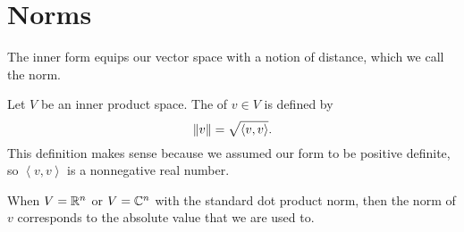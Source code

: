 \section{Norms}

The inner form equips our vector space with a notion of distance, which we call the norm.
\begin{definition}
	Let $V$ be an inner product space.
	The  of $v \in V$ is defined by
	\[ \left\lVert v \right\rVert = \sqrt{\left<v,v\right>}. \]
	This definition makes sense because
	we assumed our form to be positive definite,
	so $\left< v,v\right>$ is a nonnegative real number.
\end{definition}

\begin{example}
	When $V = \mathbb R^n$ or $V = \mathbb C^n$ with the standard dot product norm,
	then the norm of $v$ corresponds to the absolute value that we are used to.
\end{example}

